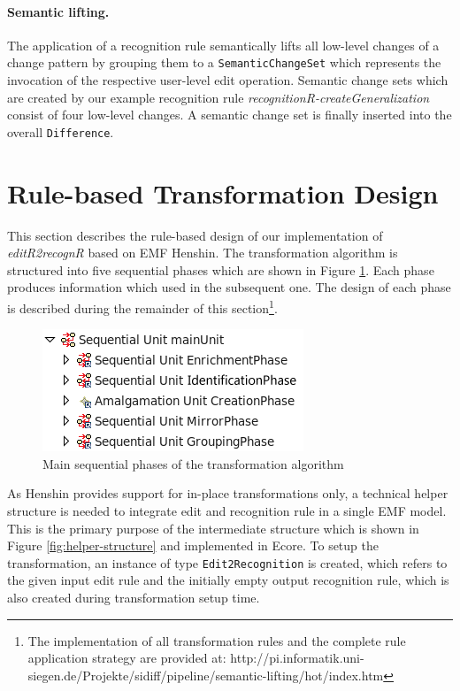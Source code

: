\documentclass{llncs}
\begin{document}
\paragraph{Semantic lifting.}
The application of a recognition rule semantically 
lifts all low-level changes of a change pattern
by grouping them to a \texttt{SemanticChangeSet}
which represents the invocation of the respective user-level
edit operation. Semantic change sets which are created
by our example recognition rule \textit{recognitionR-createGeneralization} 
consist of four low-level
changes. A semantic change set is finally inserted
into the overall \texttt{Difference}. 



\section{Rule-based Transformation Design}
\label{sec:design-implementation}
This section describes the rule-based design of our implementation of
\textit{editR2recognR} based on EMF Henshin. The transformation algorithm
is structured into five sequential phases which are shown in Figure \ref{fig:mainUnit}.
Each phase produces information which used in the subsequent
one. The design of each phase is described during the remainder
of this section\footnote{The implementation
of all transformation rules and the complete rule application 
strategy are provided at: http://pi.informatik.uni-siegen.de/Projekte/sidiff/pipeline/semantic-lifting/hot/index.htm}. 

\begin{figure}[htbp]
  \centering
  \includegraphics[scale=0.7]{pic/mainUnit.png}
  \caption{Main sequential phases of the transformation algorithm}
  \label{fig:mainUnit}
\end{figure}


As Henshin provides support for in-place transformations only,
a technical helper structure is needed to integrate edit and
recognition rule in a single EMF model. This is the primary purpose
of the intermediate structure which is shown in Figure 
\ref{fig:helper-structure} and implemented in Ecore. 
To setup the transformation, an instance of type \texttt{Edit2Recognition}
is created, which refers to the given input edit rule and the
initially empty output recognition rule, which is also created during
transformation setup time. 
\end{document}
